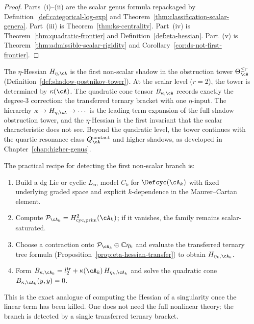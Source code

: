 \begin{proof}
Parts~(i)--(ii) are the scalar genus formula repackaged by
Definition~\ref{def:categorical-log-exp} and
Theorem~\ref{thm:classification-scalar-genera}. Part~(iii) is
Theorem~\ref{thm:ks-centrality}. Part~(iv) is
Theorem~\ref{thm:quadratic-frontier} and
Definition~\ref{def:eta-hessian}. Part~(v) is
Theorem~\ref{thm:admissible-scalar-rigidity} and
Corollary~\ref{cor:ds-not-first-frontier}.
\end{proof}

\begin{remark}
\label{rem:eta-hessian-shadow-tower}
The $\eta$-Hessian $H_{\eta,\cA}$ is the first non-scalar shadow in
the obstruction tower $\Theta_\cA^{\leq r}$
(Definition~\ref{def:shadow-postnikov-tower}). At the scalar level
($r = 2$), the tower is determined by $\kappa(\cA)$. The quadratic
cone tensor $B_{\kappa,\cA}$ records exactly the degree-$3$
correction: the transferred ternary bracket with one $\eta$-input.
The hierarchy $\kappa \to H_{\eta,\cA} \to \cdots$ is the
leading-term expansion of the full shadow obstruction tower, and the
$\eta$-Hessian is the first invariant that the scalar characteristic
does not see. Beyond the quadratic level, the tower continues with
the quartic resonance class $Q^{\mathrm{contact}}_\cA$
and higher shadows, as developed in
Chapter~\ref{chap:higher-genus}.
\end{remark}

\begin{remark}
\label{rem:computing-first-frontier}
The practical recipe for detecting the first non-scalar branch is:
\begin{enumerate}[label=\textup{(\arabic*)}]
\item Build a dg Lie or cyclic $L_\infty$ model $C_k$ for
 $\Defcyc(\cA_k)$ with fixed underlying graded space and explicit
 $k$-dependence in the Maurer--Cartan element.
\item Compute
 $\mathcal{P}_{\cA_k} = H^2_{\mathrm{cyc,prim}}(\cA_k)$; if it
 vanishes, the family remains scalar-saturated.
\item Choose a contraction onto
 $\mathcal{P}_{\cA_k} \oplus \mathbb{C}\eta_k$ and evaluate the
 transferred ternary tree formula
 (Proposition~\ref{prop:eta-hessian-transfer}) to obtain
 $H_{\eta_k, \cA_k}$.
\item Form $B_{\kappa,\cA_k}
 = l_2^{\mathrm{tr}} + \kappa(\cA_k)\, H_{\eta_k, \cA_k}$ and solve
 the quadratic cone $B_{\kappa,\cA_k}(y,y) = 0$.
\end{enumerate}
This is the exact analogue of computing the Hessian of a singularity
once the linear term has been killed. One does not need the full
nonlinear theory; the branch is detected by a single transferred
ternary bracket.
\end{remark}

